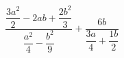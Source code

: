 \begin{ex}[type=expression]
	\begin{condition}
		\( \dfrac{\dfrac{3a^2}{2}-2ab+\dfrac{2b^2}{3}}{\dfrac{a^2}{4}-\dfrac{b^2}{9}}+\dfrac{6b}{\dfrac{3a}{4}+\dfrac{1b}{2}} \)
	\end{condition}
\end{ex}